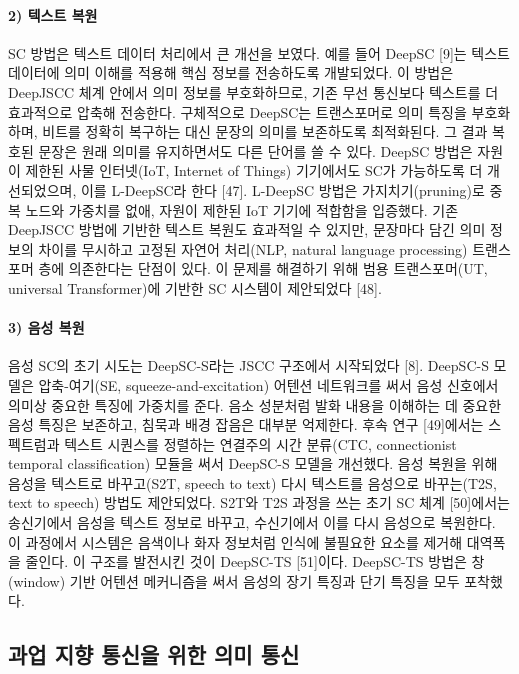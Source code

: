 \paragraph{2) 텍스트 복원}
SC 방법은 텍스트 데이터 처리에서 큰 개선을 보였다.
예를 들어 DeepSC [9]는 텍스트 데이터에 의미 이해를 적용해 핵심 정보를 전송하도록 개발되었다.
이 방법은 DeepJSCC 체계 안에서 의미 정보를 부호화하므로, 기존 무선 통신보다 텍스트를 더 효과적으로 압축해 전송한다.
구체적으로 DeepSC는 트랜스포머로 의미 특징을 부호화하며, 비트를 정확히 복구하는 대신 문장의 의미를 보존하도록 최적화된다.
그 결과 복호된 문장은 원래 의미를 유지하면서도 다른 단어를 쓸 수 있다.
DeepSC 방법은 자원이 제한된 사물 인터넷(IoT, Internet of Things) 기기에서도 SC가 가능하도록 더 개선되었으며, 이를 L-DeepSC라 한다 [47].
L-DeepSC 방법은 가지치기(pruning)로 중복 노드와 가중치를 없애, 자원이 제한된 IoT 기기에 적합함을 입증했다.
기존 DeepJSCC 방법에 기반한 텍스트 복원도 효과적일 수 있지만, 문장마다 담긴 의미 정보의 차이를 무시하고 고정된 자연어 처리(NLP, natural language processing) 트랜스포머 층에 의존한다는 단점이 있다.
이 문제를 해결하기 위해 범용 트랜스포머(UT, universal Transformer)에 기반한 SC 시스템이 제안되었다 [48].

\paragraph{3) 음성 복원}
음성 SC의 초기 시도는 DeepSC-S라는 JSCC 구조에서 시작되었다 [8].
DeepSC-S 모델은 압축-여기(SE, squeeze-and-excitation) 어텐션 네트워크를 써서 음성 신호에서 의미상 중요한 특징에 가중치를 준다.
음소 성분처럼 발화 내용을 이해하는 데 중요한 음성 특징은 보존하고, 침묵과 배경 잡음은 대부분 억제한다.
후속 연구 [49]에서는 스펙트럼과 텍스트 시퀀스를 정렬하는 연결주의 시간 분류(CTC, connectionist temporal classification) 모듈을 써서 DeepSC-S 모델을 개선했다.
음성 복원을 위해 음성을 텍스트로 바꾸고(S2T, speech to text) 다시 텍스트를 음성으로 바꾸는(T2S, text to speech) 방법도 제안되었다.
S2T와 T2S 과정을 쓰는 초기 SC 체계 [50]에서는 송신기에서 음성을 텍스트 정보로 바꾸고, 수신기에서 이를 다시 음성으로 복원한다.
이 과정에서 시스템은 음색이나 화자 정보처럼 인식에 불필요한 요소를 제거해 대역폭을 줄인다.
이 구조를 발전시킨 것이 DeepSC-TS [51]이다.
DeepSC-TS 방법은 창(window) 기반 어텐션 메커니즘을 써서 음성의 장기 특징과 단기 특징을 모두 포착했다.

\subsection{과업 지향 통신을 위한 의미 통신}

